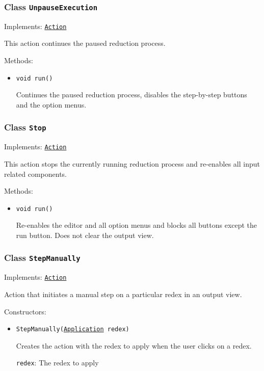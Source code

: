 \subsubsection{Class \texttt{UnpauseExecution}}
\label{type:edu.kit.wavelength.client.view.action.UnpauseExecution}
Implements: \texttt{\hyperref[type:edu.kit.wavelength.client.view.action.Action]{Action}}

This action continues the paused reduction process.

Methods:
\begin{itemize}
\item \texttt{void run()}

Continues the paused reduction process, disables the step-by-step buttons and
 the option menus.

\end{itemize}

\subsubsection{Class \texttt{Stop}}
\label{type:edu.kit.wavelength.client.view.action.Stop}
Implements: \texttt{\hyperref[type:edu.kit.wavelength.client.view.action.Action]{Action}}

This action stops the currently running reduction process and re-enables all
 input related components.

Methods:
\begin{itemize}
\item \texttt{void run()}

Re-enables the editor and all option menus and blocks all buttons except the
 run button. Does not clear the output view.

\end{itemize}

\subsubsection{Class \texttt{StepManually}}
\label{type:edu.kit.wavelength.client.view.action.StepManually}
Implements: \texttt{\hyperref[type:edu.kit.wavelength.client.view.action.Action]{Action}}

Action that initiates a manual step on a particular redex in an output view.

Constructors:
\begin{itemize}
\item \texttt{StepManually(\hyperref[type:edu.kit.wavelength.client.model.term.Application]{Application} redex)}

Creates the action with the redex to apply when the user clicks on a
 redex.

\texttt{redex}: The redex to apply

\end{itemize}

